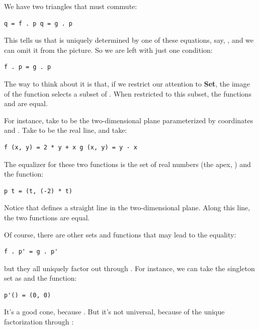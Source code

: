 We have two triangles that must commute:

\begin{verbatim}
q = f . p q = g . p
\end{verbatim}

This tells us that  is uniquely determined by one of these
equations, say, , and we can omit it from the
picture. So we are left with just one condition:

\begin{verbatim}
f . p = g . p
\end{verbatim}

The way to think about it is that, if we restrict our attention to
\textbf{Set}, the image of the function  selects a subset of
. When restricted to this subset, the functions  and
 are equal.

For instance, take  to be the two-dimensional plane
parameterized by coordinates  and . Take 
to be the real line, and take:

\begin{verbatim}
f (x, y) = 2 * y + x g (x, y) = y - x
\end{verbatim}

The equalizer for these two functions is the set of real numbers (the
apex, ) and the function:

\begin{verbatim}
p t = (t, (-2) * t)
\end{verbatim}

Notice that  defines a straight line in the
two-dimensional plane. Along this line, the two functions are equal.

Of course, there are other sets  and functions
 that may lead to the equality:

\begin{verbatim}
f . p' = g . p'
\end{verbatim}

but they all uniquely factor out through . For instance, we
can take the singleton set \code{()} as  and the
function:

\begin{verbatim}
p'() = (0, 0)
\end{verbatim}

It's a good cone, because . But it's
not universal, because of the unique factorization through :

